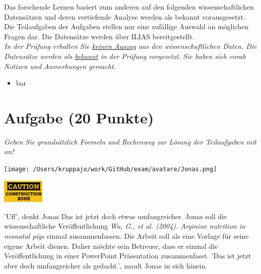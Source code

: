 \documentclass[a4paper, 9pt]{scrartcl}\usepackage[]{graphicx}\usepackage[]{xcolor}
\begin{document}
Das forschende Lernen basiert zum anderen auf den folgenden wissenschaftlichen Datensätzen und deren vertiefende Analyse werden als bekannt vorausgesetzt. Die Teilaufgaben der Aufgaben stellen nur eine zufällige Auswahl an möglichen Fragen dar. Die Datensätze werden über ILIAS bereitgestellt.\\

\textit{In der Prüfung erhalten Sie \underline{keinen Auszug} aus den wissenschaftlichen Daten. Die Datensätze werden als \underline{bekannt} in der Prüfung vorgesetzt. Sie haben sich vorab Notizen und Anmerkungen gemacht.}

\begin{itemize}[noitemsep]
\item bar
\end{itemize}

\clearpage

\section{Aufgabe \hfill (20 Punkte)}

\textit{Geben Sie grundsätzlich Formeln und Rechenweg zur Lösung der Teilaufgaben mit an!} \\[1Ex]
 

 
\begin{minipage}[t]{0.5\textwidth}
\texttt{[image: /Users/kruppajo/work/GitHub/exam/avatare/Jonas.png]}
\end{minipage}
\begin{minipage}[t]{0.5\textwidth}
\hfill
\href{https://youtu.be/C9skfFRTHhI}{\includegraphics[width = 2cm]{img/caution}}
\end{minipage}
\vspace{1ex}



'Uff', denkt Jonas Das ist jetzt doch etwas umfangreicher. Jonas soll die wissenschaftliche Veröffentlichung \textit{Wu, G., et al. (2004). Arginine nutrition in neonatal pigs} einmal zusammenfassen. Die Arbeit soll als eine Vorlage für seine eigene Arbeit dienen. Daher möchte sein Betreuer, dass er einmal die Veröffentlichung in einer PowerPoint Präsentation zusammenfasst. 'Das ist jetzt aber doch umfangreicher als gedacht.', mault Jonas in sich hinein.\\
\end{document}
